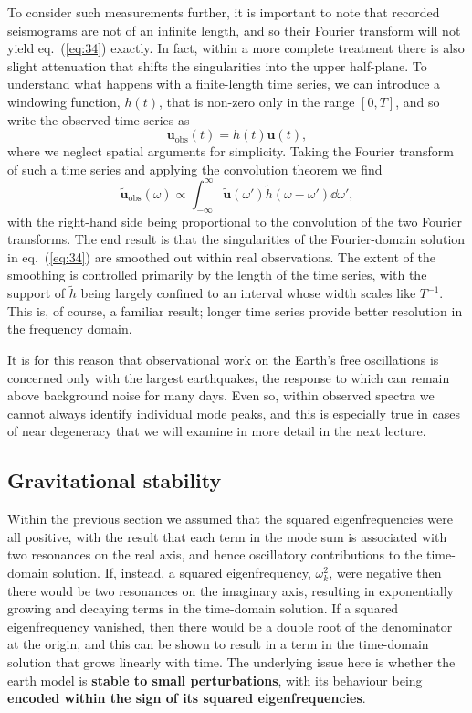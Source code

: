 To consider such measurements further, it is important to note that recorded seismograms are not of an infinite length, and so their Fourier 
transform will not yield eq.~(\ref{eq:34}) exactly. In fact, within a more complete treatment there is also slight attenuation that shifts the singularities 
into the upper half-plane. To understand what happens with a finite-length time series, we can introduce a windowing function, $h(t)$, that is non-zero only in the 
range $[0,T]$, and so write the observed time series as
\begin{equation}
\mathbf{u}_{\mathrm{obs}}(t)=h(t)\mathbf{u}(t),
\label{eq:35}
\end{equation}
where we neglect spatial arguments for simplicity. Taking the Fourier transform of such a time series and applying the convolution theorem we find
\begin{equation}
\tilde{\mathbf{u}}_{\mathrm{obs}}(\omega)\propto\int_{-\infty}^{\infty}\tilde{\mathbf{u}}(\omega')\tilde{h}(\omega-\omega')\dd\omega',
\label{eq:36}
\end{equation}
with the right-hand side being proportional to the convolution of the two Fourier transforms. The end result is that the singularities of the 
Fourier-domain solution in eq.~(\ref{eq:34}) are smoothed out within real observations. The extent of the smoothing is controlled primarily by the 
length of the time series, with the support of $\tilde{h}$ being largely confined to an interval whose width scales like $T^{-1}$. This is, of 
course, a familiar result; longer time series provide better resolution in the frequency domain. 

It is for this reason that observational work on the Earth's free oscillations is concerned only with the largest earthquakes, the response 
to which can remain above background noise for many days. Even so, within observed spectra we cannot always identify individual mode peaks, and 
this is especially true in cases of near degeneracy that we will examine in more detail in the next lecture.

\subsection*{Gravitational stability}
Within the previous section we assumed that the squared eigenfrequencies were all positive, with the result that each term in the mode sum is 
associated with two resonances on the real axis, and hence oscillatory contributions to the time-domain solution. If, instead, a squared eigenfrequency, 
$\omega_{k}^{2}$, were negative then there would be two resonances on the imaginary axis, resulting in exponentially growing and decaying terms in the 
time-domain solution. If a squared eigenfrequency vanished, then there would be a double root of the denominator at the origin, 
and this can be shown to result in a term in the time-domain solution that grows linearly with time.
The underlying issue here is whether the earth model is \textbf{stable to small perturbations}, with its behaviour being \textbf{encoded within the sign 
of its squared eigenfrequencies}.

